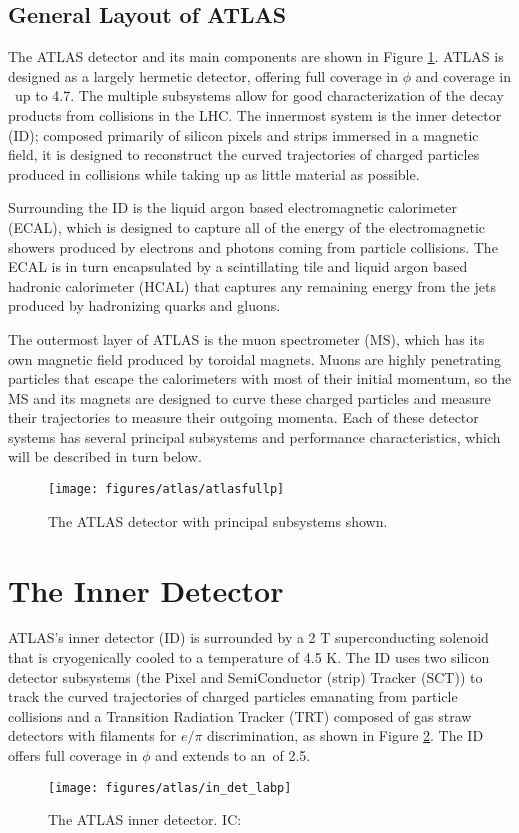 \subsection{General Layout of ATLAS}
The ATLAS detector and its main components are shown in Figure \ref{fig:atlas}.  ATLAS is designed as a largely hermetic detector, offering full coverage in $\phi$ and coverage in \aeta\, up to 4.7.  The multiple subsystems allow for good characterization of the decay products from collisions in the LHC.  The innermost system is the inner detector (ID); composed primarily of silicon pixels and strips immersed in a magnetic field, it is designed to reconstruct the curved trajectories of charged particles produced in collisions while taking up as little material as possible.

  Surrounding the ID is the liquid argon based electromagnetic calorimeter (ECAL), which is designed to capture all of the energy of the electromagnetic showers produced by electrons and photons coming from particle collisions.  The ECAL is in turn encapsulated by a scintillating tile and liquid argon based hadronic calorimeter (HCAL) that captures any remaining energy from the jets produced by hadronizing quarks and gluons.

  The outermost layer of ATLAS is the muon spectrometer (MS), which has its own magnetic field produced by toroidal magnets.  Muons are highly penetrating particles that escape the calorimeters with most of their initial momentum, so the MS and its magnets are designed to curve these charged particles and measure their trajectories to measure their outgoing momenta.  Each of these detector systems has several principal subsystems and performance characteristics, which will be described in turn below.

\begin{figure}[!htbp]\captionsetup{justification=centering}
  \centering
  \texttt{[image: figures/atlas/atlasfullp]}
  \caption{The ATLAS detector with principal subsystems shown.}
  \label{fig:atlas}
\end{figure}

\section{The Inner Detector}
ATLAS's inner detector (ID) is surrounded by a 2 T superconducting solenoid that is cryogenically cooled to a temperature of 4.5 K.  The ID uses two silicon detector subsystems (the Pixel and SemiConductor (strip) Tracker (SCT)) to track the curved trajectories of charged particles emanating from particle collisions and a Transition Radiation Tracker (TRT) composed of gas straw detectors with filaments for $e/\pi$ discrimination, as shown in Figure \ref{fig:indet}.  The ID offers full coverage in $\phi$ and extends to an \aeta\,of 2.5.  
\begin{figure}[!htbp]\captionsetup{justification=centering}
  \centering
  \texttt{[image: figures/atlas/in\_det\_labp]}
  \caption{The ATLAS inner detector. IC: \cite{jinstpaper}}
  \label{fig:indet}
\end{figure}

